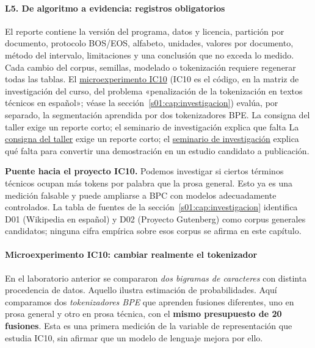 \paragraph{L5. De algoritmo a evidencia: registros obligatorios}
El reporte contiene la versión del programa, datos y licencia,
partición por documento, protocolo BOS/EOS, alfabeto, unidades,
valores por documento, método del intervalo, limitaciones y
una conclusión que no exceda lo medido. Cada cambio del corpus,
semillas, modelado o tokenización requiere regenerar todas las tablas.
El \hyperref[s01:lab:ic10]{microexperimento IC10} (IC10 es el código, en la matriz de investigación del curso, del problema «penalización de la tokenización en textos técnicos en español»; véase la sección~\ref{s01:cap:investigacion}) evalúa, por separado,
la segmentación aprendida por dos tokenizadores BPE.
\ifdefined\labcompstandalone
La consigna del taller exige un reporte corto; el seminario de
investigación explica que falta
\else
La \hyperref[s01:mod:taller]{consigna del taller} exige un reporte corto;
el \hyperref[s01:mod:invest]{seminario de investigación} explica qué falta
\fi
para convertir una demostración en un estudio candidato a publicación.




\textbf{Puente hacia el proyecto IC10.} Podemos investigar si ciertos términos técnicos ocupan más tokens por palabra que la prosa general. Esto ya es una medición falsable y puede ampliarse a BPC con modelos adecuadamente controlados. La tabla de fuentes de la sección~\ref{s01:cap:investigacion} identifica D01 (Wikipedia en español) y D02 (Proyecto Gutenberg) como corpus generales candidatos; ninguna cifra empírica sobre esos corpus se afirma en este capítulo.

\paragraph{Microexperimento IC10: cambiar realmente el tokenizador}
\label{s01:lab:ic10}
\begin{idea}
En el laboratorio anterior se compararon \emph{dos bigramas de caracteres}
con distinta procedencia de datos. Aquello ilustra estimación de
probabilidades. Aquí comparamos dos \emph{tokenizadores BPE} que aprenden
fusiones diferentes, uno en prosa general y otro en prosa técnica, con el
\textbf{mismo presupuesto de 20 fusiones}. Esta es una primera medición de
la variable de representación que estudia IC10, sin afirmar que un
modelo de lenguaje mejora por ello.
\end{idea}
